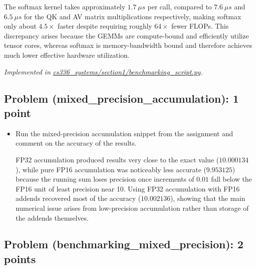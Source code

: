 \documentclass[letterpaper]{article}
\newcommand{\repofile}[2]{\href{https://github.com/echung32/ece405-assignment4-hpc/blob/main/#1}{#2}}
\begin{document}
\begin{itemize}
		The softmax kernel takes approximately \(1.7~\mu s\) per call, compared to \(7.6~\mu s\) and \(6.5~\mu s\) for the QK and AV matrix multiplications respectively, making softmax only about \(4.5\times\) faster despite requiring roughly \(64\times\) fewer FLOPs. This discrepancy arises because the GEMMs are compute-bound and efficiently utilize tensor cores, whereas softmax is memory-bandwidth bound and therefore achieves much lower effective hardware utilization.
	\end{itemize}
	
	\textit{Implemented in \repofile{cs336_systems/section1/benchmarking_script.py}{cs336\_systems/section1/benchmarking\_script.py}.}
	
	\subsection{Problem (mixed\_precision\_accumulation): 1 point}
	
	\begin{itemize}
		\item[(a)] Run the mixed-precision accumulation snippet from the assignment and comment on the accuracy of the results.
		
		FP32 accumulation produced results very close to the exact value (\(10.000134\)), while pure FP16 accumulation was noticeably less accurate (\(9.953125\)) because the running sum loses precision once increments of \(0.01\) fall below the FP16 unit of least precision near 10. Using FP32 accumulation with FP16 addends recovered most of the accuracy (\(10.002136\)), showing that the main numerical issue arises from low-precision accumulation rather than storage of the addends themselves.
	\end{itemize}
	
	\subsection{Problem (benchmarking\_mixed\_precision): 2 points}
	
\end{document}
